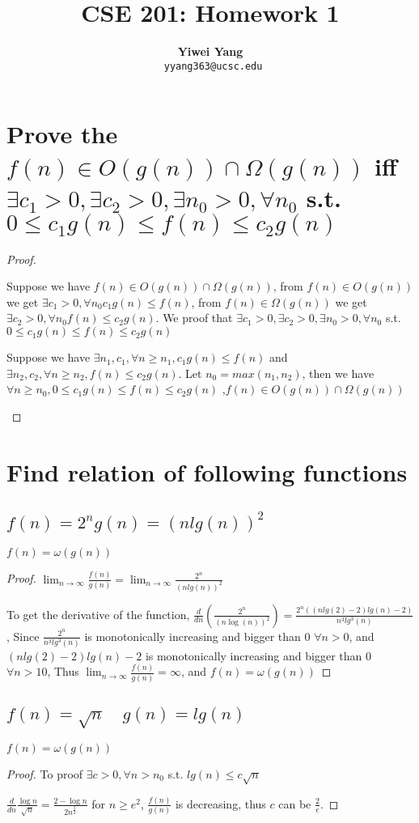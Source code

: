 \documentclass[a4paper]{article}
\title{CSE 201: Homework 1}
\author{\textbf{Yiwei Yang} \\ \texttt{ yyang363@ucsc.edu}}
\begin{document}
\maketitle
\section{Prove the $f(n)\in O(g(n))\cap \Omega(g(n))$ iff $\exists c_1>0,\exists c_2>0,\exists n_0>0, \forall n_0$ s.t. $0\leq c_1 g(n)\leq f(n)\leq c_2g(n)$}
\begin{proof}
    \begin{enumurate} 
        \item Suppose we have $f(n)\in O(g(n))\cap \Omega(g(n))$, from $f(n)\in O(g(n))$ we get $\exists c_1>0, \forall n_0 c_1g(n)\leq f(n)$, from $f(n)\in \Omega(g(n))$ we get $\exists c_2>0, \forall n_0 f(n)\leq c_2g(n)$. We proof that $\exists c_1>0,\exists c_2>0,\exists n_0>0, \forall n_0$ s.t. $0\leq c_1 g(n)\leq f(n)\leq c_2g(n)$
        \item Suppose we have $\exists n_1, c_1, \forall n \geq n_1, c_1 g(n) \leq f(n) $ and $\exists n_2, c_2, \forall n \geq n_2, f(n) \leq c_2 g(n)$. Let $n_0 = max(n_1, n_2)$, then we have $\forall n\geq n_0, 0\leq c_1 g(n)\leq f(n)\leq c_2g(n) $ ,$f(n)\in O(g(n))\cap \Omega(g(n))$
    \end{enumurate}
\end{proof}
\section{Find relation of following functions}
\subsection{$f(n)=2^n g(n)={(n lg(n))^2}$}
$f(n)=\omega(g(n))$
 \begin{proof}
 $\lim _{n \rightarrow \infty} \frac{f(n)}{g(n)}= \lim _{n \rightarrow \infty} \frac{2^n}{(n lg(n))^2}$ 
 
 To get the derivative of the function, $\frac{d}{d n}\left(\frac{2^n}{(n \log (n))^2}\right) =\frac{2^n((n lg (2)-2) lg (n)-2)}{n^3 lg ^3(n)}$, Since $\frac {2^n}{n^3 lg ^3(n)}$ is monotonically increasing and bigger than 0 $\forall n > 0$, and $(n lg (2)-2) lg (n)-2$ is monotonically increasing and bigger than 0 $\forall n > 10$, Thus $\lim _{n \rightarrow \infty} \frac{f(n)}{g(n)}=\infty$, and $f(n)=\omega(g(n))$
\end{proof}
\subsection{$f(n)=\sqrt{n} \quad g(n)= lg (n)$}
$f(n)=\omega(g(n))$
\begin{proof}
   To proof $\exists c>0, \forall n>n_0$ s.t. $lg(n)\leq c\sqrt{n}$
   
   $\frac{d}{d n} \frac{\log n}{\sqrt{n}}=\frac{2-\log n}{2 n^{\frac{3} {2}}}$ for $n\geq e^2$, $\frac{f(n)}{g(n)}$ is decreasing, thus $c$ can be $\frac{2}{e}$.
\end{proof}
\end{document}
